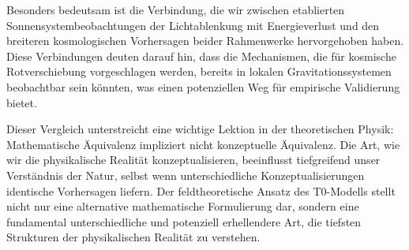 \documentclass[12pt,a4paper]{article}
\begin{document}
	Besonders bedeutsam ist die Verbindung, die wir zwischen etablierten Sonnensystembeobachtungen der Lichtablenkung mit Energieverlust und den breiteren kosmologischen Vorhersagen beider Rahmenwerke hervorgehoben haben. Diese Verbindungen deuten darauf hin, dass die Mechanismen, die für kosmische Rotverschiebung vorgeschlagen werden, bereits in lokalen Gravitationssystemen beobachtbar sein könnten, was einen potenziellen Weg für empirische Validierung bietet.
	
	Dieser Vergleich unterstreicht eine wichtige Lektion in der theoretischen Physik: Mathematische Äquivalenz impliziert nicht konzeptuelle Äquivalenz. Die Art, wie wir die physikalische Realität konzeptualisieren, beeinflusst tiefgreifend unser Verständnis der Natur, selbst wenn unterschiedliche Konzeptualisierungen identische Vorhersagen liefern. Der feldtheoretische Ansatz des T0-Modells stellt nicht nur eine alternative mathematische Formulierung dar, sondern eine fundamental unterschiedliche und potenziell erhellendere Art, die tiefsten Strukturen der physikalischen Realität zu verstehen.
	
\end{document}
